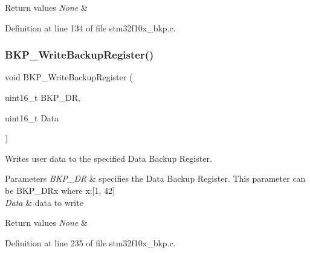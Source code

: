 \begin{DoxyRetVals}{Return values}
{\em None} & \\
\hline
\end{DoxyRetVals}


Definition at line 134 of file stm32f10x\+\_\+bkp.\+c.

\mbox{\label{group___b_k_p___exported___functions_ga18d220387db651b3cb71fad5c092e041}} 
\subsubsection{\texorpdfstring{B\+K\+P\+\_\+\+Write\+Backup\+Register()}{BKP\_WriteBackupRegister()}}
{\footnotesize\ttfamily void B\+K\+P\+\_\+\+Write\+Backup\+Register (\begin{DoxyParamCaption}\item[{uint16\+\_\+t}]{B\+K\+P\+\_\+\+DR,  }\item[{uint16\+\_\+t}]{Data }\end{DoxyParamCaption})}



Writes user data to the specified Data Backup Register. 


\begin{DoxyParams}{Parameters}
{\em B\+K\+P\+\_\+\+DR} & specifies the Data Backup Register. This parameter can be B\+K\+P\+\_\+\+D\+Rx where x\+:\mbox{[}1, 42\mbox{]} \\
\hline
{\em Data} & data to write \\
\hline
\end{DoxyParams}

\begin{DoxyRetVals}{Return values}
{\em None} & \\
\hline
\end{DoxyRetVals}


Definition at line 235 of file stm32f10x\+\_\+bkp.\+c.

